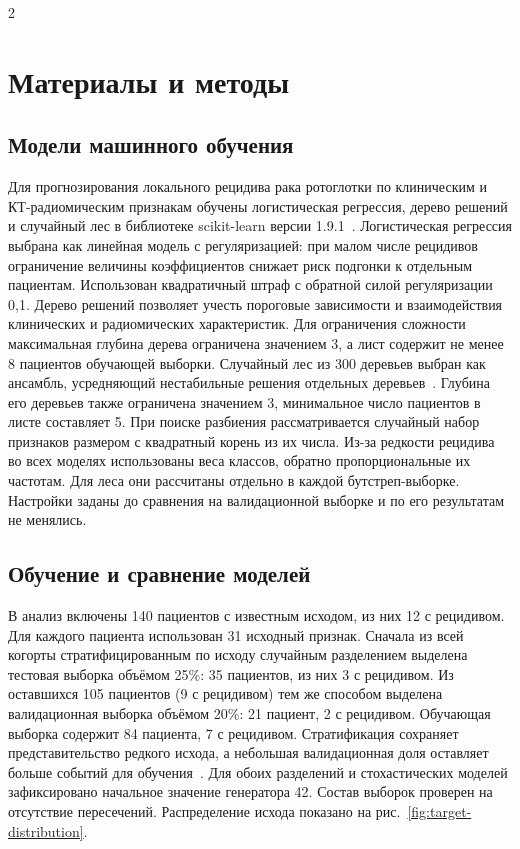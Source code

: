 \documentclass[11pt, a4paper]{article}
\begin{document}
\thispagestyle{firstpage}
\begin{multicols}{2}
\section*{Материалы и методы}
\subsection*{Модели машинного обучения}
Для прогнозирования локального рецидива рака ротоглотки по клиническим и КТ-радиомическим признакам обучены логистическая регрессия, дерево решений и случайный лес в библиотеке scikit-learn версии 1.9.1~\cite{Pedregosa2011}. Логистическая регрессия выбрана как линейная модель с регуляризацией: при малом числе рецидивов ограничение величины коэффициентов снижает риск подгонки к отдельным пациентам. Использован квадратичный штраф с обратной силой регуляризации 0,1. Дерево решений позволяет учесть пороговые зависимости и взаимодействия клинических и радиомических характеристик. Для ограничения сложности максимальная глубина дерева ограничена значением 3, а лист содержит не менее 8 пациентов обучающей выборки. Случайный лес из 300 деревьев выбран как ансамбль, усредняющий нестабильные решения отдельных деревьев~\cite{Breiman2001}. Глубина его деревьев также ограничена значением 3, минимальное число пациентов в листе составляет 5. При поиске разбиения рассматривается случайный набор признаков размером с квадратный корень из их числа. Из-за редкости рецидива во всех моделях использованы веса классов, обратно пропорциональные их частотам. Для леса они рассчитаны отдельно в каждой бутстреп-выборке. Настройки заданы до сравнения на валидационной выборке и по его результатам не менялись.

\subsection*{Обучение и сравнение моделей}
В анализ включены 140 пациентов с известным исходом, из них 12 с рецидивом. Для каждого пациента использован 31 исходный признак. Сначала из всей когорты стратифицированным по исходу случайным разделением выделена тестовая выборка объёмом 25\%: 35 пациентов, из них 3 с рецидивом. Из оставшихся 105 пациентов (9 с рецидивом) тем же способом выделена валидационная выборка объёмом 20\%: 21 пациент, 2 с рецидивом. Обучающая выборка содержит 84 пациента, 7 с рецидивом. Стратификация сохраняет представительство редкого исхода, а небольшая валидационная доля оставляет больше событий для обучения~\cite{Riley2020}. Для обоих разделений и стохастических моделей зафиксировано начальное значение генератора 42. Состав выборок проверен на отсутствие пересечений. Распределение исхода показано на рис.~\ref{fig:target-distribution}.


\end{multicols}
\end{document}
